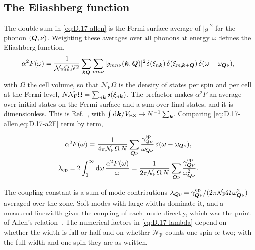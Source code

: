 \subsection*{The Eliashberg function}

The double sum in \cref{eq:D.17-allen} is the Fermi-surface average of $|g|^2$ for the phonon $(\bm{Q},\nu)$. Weighting these averages over all phonons at energy $\omega$ defines the Eliashberg function,
\begin{equation}
  \alpha^2F(\omega) = \frac{1}{\mathcal{N}_{\mathrm{F}}\Omega\,N^2}\sum_{\bm{k}\bm{Q}}\sum_{mn\nu}|g_{mn\nu}(\bm{k},\bm{Q})|^2\,\delta(\xi_{n\bm{k}})\,\delta(\xi_{m,\bm{k}+\bm{Q}})\,\delta(\omega - \omega_{\bm{Q}\nu}) ,
  \label{eq:D.17-a2F}
\end{equation}
with $\Omega$ the cell volume, so that $\mathcal{N}_{\mathrm{F}}\Omega$ is the density of states per spin and per cell at the Fermi level, $N\mathcal{N}_{\mathrm{F}}\Omega = \sum_{n\bm{k}}\delta(\xi_{n\bm{k}})$. The prefactor makes $\alpha^2F$ an average over initial states on the Fermi surface and a sum over final states, and it is dimensionless. This is Ref.~\cite[Eq.~(205)]{giustino2017electron}, with $\int\mathrm{d}\bm{k}/V_{\mathrm{BZ}} \to N^{-1}\sum_{\bm{k}}$. Comparing \cref{eq:D.17-allen,eq:D.17-a2F} term by term,
\begin{keyresult}
\begin{equation}
  \begin{gathered}
  \alpha^2F(\omega) = \frac{1}{4\pi\mathcal{N}_{\mathrm{F}}\Omega\,N}\sum_{\bm{Q}\nu}\frac{\gamma^{\mathrm{ep}}_{\bm{Q}\nu}}{\omega_{\bm{Q}\nu}}\,\delta(\omega - \omega_{\bm{Q}\nu}), \\
  \lambda_{\mathrm{ep}} = 2\int_0^\infty\mathrm{d}\omega\,\frac{\alpha^2F(\omega)}{\omega} = \frac{1}{2\pi\mathcal{N}_{\mathrm{F}}\Omega\,N}\sum_{\bm{Q}\nu}\frac{\gamma^{\mathrm{ep}}_{\bm{Q}\nu}}{\omega_{\bm{Q}\nu}^2} .
  \end{gathered}
  \label{eq:D.17-lambda}
\end{equation}
\end{keyresult}
The coupling constant is a sum of mode contributions $\lambda_{\bm{Q}\nu} = \gamma^{\mathrm{ep}}_{\bm{Q}\nu}/(2\pi\mathcal{N}_{\mathrm{F}}\Omega\,\omega_{\bm{Q}\nu}^2)$ averaged over the zone. Soft modes with large widths dominate it, and a measured linewidth gives the coupling of each mode directly, which was the point of Allen's relation~\cite{allen1972neutron}. The numerical factors in \cref{eq:D.17-lambda} depend on whether the width is full or half and on whether $\mathcal{N}_{\mathrm{F}}$ counts one spin or two; with the full width and one spin they are as written.

